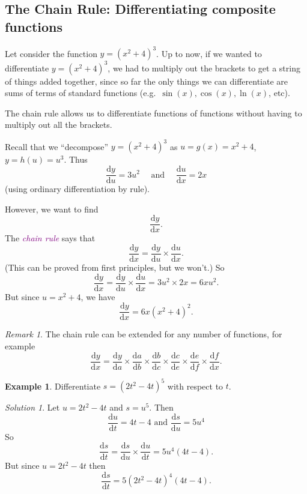 \documentclass[
  english,
  11pt,
  oneside]{book}
\newcommand{\slide}{}
\theoremstyle{definition}
\theoremstyle{definition}
\newtheorem{example}{Example}[chapter]
\theoremstyle{definition}
\theoremstyle{definition}
\theoremstyle{remark}
\newtheorem*{remark}{Remark}
\newtheorem*{solution}{Solution}
\begin{document}
\subsection{The Chain Rule: Differentiating composite functions}\label{the-chain-rule-differentiating-composite-functions}

Let consider the function \(y = (x^2+ 4)^3\). Up to now, if we wanted to differentiate \(y = (x^2 + 4)^3\), we had to multiply out the brackets to get a string of things added together, since so far the only things we can differentiate are sums of terms of standard functions (e.g.~\(\sin(x), \cos(x), \ln(x)\), etc).

The chain rule allows us to differentiate functions of functions without having to multiply out all the brackets.

\slide

Recall that we ``decompose'' \(y=(x^2+4)^3\) as \(u = g(x) = x^2+4\), \(y = h(u) = u^3\).
Thus
\[
\frac{\mathrm{d} y}{\mathrm{d} u} = 3u^2 \quad\text{ and }\quad
\frac{\mathrm{d} u}{\mathrm{d} x} = 2x
\]
(using ordinary differentiation by rule).

However, we want to find
\[
\frac{\mathrm{d} y}{\mathrm{d} x}.
\]
The \textcolor{purple}{\em chain rule} says that
\[
\frac{\mathrm{d} y}{\mathrm{d} x} = \frac{\mathrm{d} y}{\mathrm{d} u}\times \frac{\mathrm{d} u}{\mathrm{d} x}.
\]
(This can be proved from first principles, but we won't.)
So
\[
\frac{\mathrm{d} y}{\mathrm{d} x} = \frac{\mathrm{d} y}{\mathrm{d} u}\times \frac{\mathrm{d} u}{\mathrm{d} x} = 3u^2\times 2x = 6xu^2.
\]
But since \(u = x^2+4\), we have
\[
\frac{\mathrm{d} y}{\mathrm{d} x} = 6x(x^2 +4)^2.
\]

\begin{remark}
The chain rule can be extended for any number of functions, for example
\[
\frac{\mathrm{d} y}{\mathrm{d} x} = \frac{\mathrm{d} y}{\mathrm{d} a}\times \frac{\mathrm{d} a}{\mathrm{d} b}\times \frac{\mathrm{d} b}{\mathrm{d} c}\times \frac{\mathrm{d} c}{\mathrm{d} e}\times\frac{\mathrm{d} e}{\mathrm{d} f}\times\frac{\mathrm{d} f}{\mathrm{d} x}.
\]
\end{remark}

\slide

\begin{example}
Differentiate \(s = (2t^2- 4t)^5\) with respect to \(t\).
\end{example}

\begin{solution}
Let \(u = 2t^2-4t\) and \(s = u^5\). Then
\[
\frac{\mathrm{d} u}{\mathrm{d} t} = 4t-4\text{ and }\frac{\mathrm{d} s}{\mathrm{d} u} = 5u^4
\]
So
\[
\frac{\mathrm{d} s}{\mathrm{d} t} = \frac{\mathrm{d} s}{\mathrm{d} u}\times\frac{\mathrm{d} u}{\mathrm{d} t} = 5u^4(4t-4).
\]
But since \(u = 2t^2-4t\) then
\[
\frac{\mathrm{d} s}{\mathrm{d} t} = 5(2t^2-4t)^4(4t-4).
\]
\end{solution}
\end{document}
